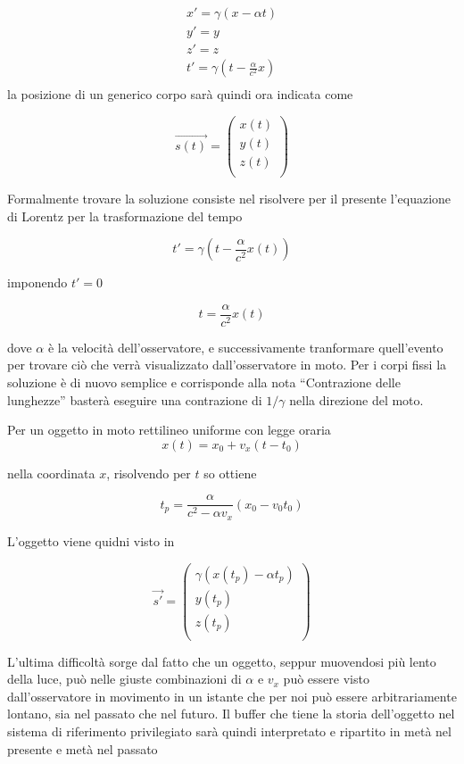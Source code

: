 \documentclass{report}
\begin{document}
$$ 
\begin{matrix} 
x' = \gamma(x-\alpha t)\\
y' = y\\
z' = z\\
 t' = \gamma( t - \frac{\alpha}{c^2}x)\\
\end{matrix}
$$
la posizione di un generico corpo sarà quindi ora indicata come

$$ \vec{s(t)} =\left( \begin{matrix} x(t) \\ y(t) \\ z(t)\\ \end{matrix} \right)$$

Formalmente trovare la soluzione consiste nel risolvere per il presente l’equazione di Lorentz per la
trasformazione del tempo

$$ t' = \gamma( t - \frac{\alpha}{c^2}x(t)) $$

imponendo $t' =0$

$$ t=  \frac{\alpha}{c^2}x(t)  $$

dove $\alpha$ è la velocità dell’osservatore, e successivamente tranformare quell’evento per trovare ciò che verrà
visualizzato dall'osservatore in moto.
Per i corpi fissi la soluzione è di nuovo semplice e corrisponde alla nota “Contrazione delle lunghezze”
basterà eseguire una contrazione di $1/\gamma$ nella direzione del moto.

Per un oggetto in moto rettilineo uniforme con legge oraria
$$ x(t) = x_0 + v_x(t- t_0)$$

nella coordinata $x$, risolvendo per $t$ so ottiene

$$ t_p = \frac{\alpha}{c^2-\alpha v_x} (x_0-v_0 t_0) $$

L'oggetto viene quidni visto in

$$ \vec{s'} =\left( \begin{matrix} \gamma( x(t_p) - \alpha t_p) \\ y(t_p) \\ z(t_p)\\ \end{matrix} \right)$$

L’ultima difficoltà sorge dal fatto che un oggetto, seppur muovendosi più lento della luce, può nelle giuste
combinazioni di $\alpha$ e $v_x$ può essere visto dall’osservatore in movimento in un istante che per noi può essere
arbitrariamente lontano, sia nel passato che nel futuro.
Il buffer che tiene la storia dell’oggetto nel sistema di riferimento privilegiato sarà quindi interpretato e ripartito in
metà nel presente e metà nel passato
\end{document}
